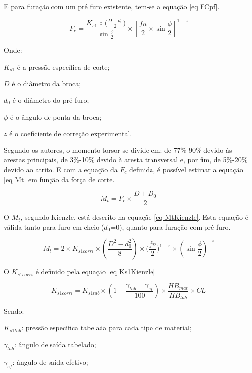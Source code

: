 \documentclass[deposito, acronym, symbols]{fei}
\begin{document}
E para furação com um pré furo existente, tem-se a equação \ref{eq FCpf}.

\begin{equation}
    \label{eq FCpf}
    F_c=\frac{K_{s1}\times{(\frac{D-d_0}{2}})}{\sin{\frac{\phi}{2}}}\times[{\frac{fn}{2}}\times{\sin{\frac{\phi}{2}}}]^{1-z}
\end{equation}

Onde:

$K_{s1}$ é a pressão específica de corte;

$D$ é o diâmetro da broca;

$d_0$ é o diâmetro do pré furo;

$\phi$ é o ângulo de ponta da broca;

$z$ é o coeficiente de correção experimental.




Segundo os autores, o momento torsor se divide em: de 77\%-90\% devido às arestas principais, de 3\%-10\% devido à aresta transversal e, por fim, de 5\%-20\% devido ao atrito. 
E com a equação da $F_c$ definida, é possível estimar a equação \ref{eq Mt} em função da força de corte.

\begin{equation}
    \label{eq Mt}
    M_t=F_c\times{\frac{D+D_0}{2}}
\end{equation}

O $M_t$, segundo Kienzle, está descrito na equação \ref{eq MtKienzle}. Esta equação é válida tanto para furo em cheio ($d_0$=0), quanto para furação com pré furo.

\begin{equation}
    \label{eq MtKienzle}
    M_t=2\times{K_{s1corri}}\times{(\frac{D^2-d_0^2}{8})}\times{(\frac{fn}{2}})^{1-z}\times({\sin{\frac{\phi}{2}}})^{-z}
\end{equation}

O $K_{s1corri}$ é definido pela equação \ref{eq Ks1Kienzle}

\begin{equation}
    \label{eq Ks1Kienzle}
    K_{s1corri}=K_{s1tab}\times{(1+\frac{\gamma_{tab}-\gamma_{ef}}{100})}\times{\frac{HB_{mat}}{HB_{tab}}}\times{CL}
\end{equation}

Sendo:

$K_{s1tab}$: pressão específica tabelada para cada tipo de material;

$\gamma_{tab}$: ângulo de saída tabelado;

$\gamma_{ef}$: ângulo de saída efetivo;
\end{document}
